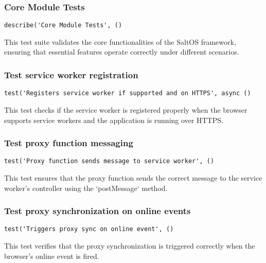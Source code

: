 \documentclass[a4paper]{article}
\begin{document}
\subsubsection{Core Module Tests}

\begin{lstlisting}
describe('Core Module Tests', ()
\end{lstlisting}

This test suite validates the core functionalities of the SaltOS framework,
ensuring that essential features operate correctly under different scenarios.

\hypertarget{toc540}{}
\subsubsection{Test service worker registration}

\begin{lstlisting}
test('Registers service worker if supported and on HTTPS', async ()
\end{lstlisting}

This test checks if the service worker is registered properly when the
browser supports service workers and the application is running over HTTPS.

\hypertarget{toc541}{}
\subsubsection{Test proxy function messaging}

\begin{lstlisting}
test('Proxy function sends message to service worker', ()
\end{lstlisting}

This test ensures that the proxy function sends the correct message
to the service worker's controller using the `postMessage` method.

\hypertarget{toc542}{}
\subsubsection{Test proxy synchronization on online events}

\begin{lstlisting}
test('Triggers proxy sync on online event', ()
\end{lstlisting}

This test verifies that the proxy synchronization is triggered correctly
when the browser's online event is fired.
\end{document}
